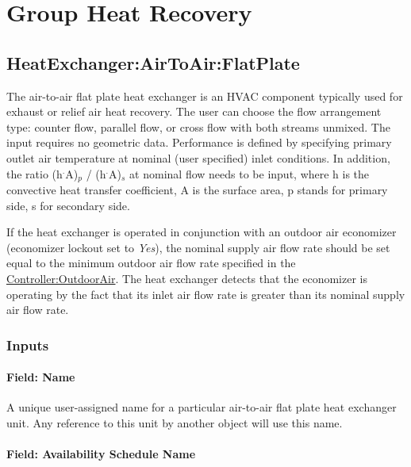 \section{Group Heat Recovery}\label{group-heat-recovery}

\subsection{HeatExchanger:AirToAir:FlatPlate}\label{heatexchangerairtoairflatplate}

The air-to-air flat plate heat exchanger is an HVAC component typically used for exhaust or relief air heat recovery. The user can choose the flow arrangement type: counter flow, parallel flow, or cross flow with both streams unmixed. The input requires no geometric data. Performance is defined by specifying primary outlet air temperature at nominal (user specified) inlet conditions. In addition, the ratio (h\(^{.}\)A)\(_{p}\) / (h\(^{.}\)A)\(_{s}\) at nominal flow needs to be input, where h is the convective heat transfer coefficient, A is the surface area, p stands for primary side, s for secondary side.

If the heat exchanger is operated in conjunction with an outdoor air economizer (economizer lockout set to \emph{Yes}), the nominal supply air flow rate should be set equal to the minimum outdoor air flow rate specified in the \hyperref[controlleroutdoorair]{Controller:OutdoorAir}. The heat exchanger detects that the economizer is operating by the fact that its inlet air flow rate is greater than its nominal supply air flow rate.

\subsubsection{Inputs}\label{inputs-021}

\paragraph{Field: Name}\label{field-name-020}

A unique user-assigned name for a particular air-to-air flat plate heat exchanger unit. Any reference to this unit by another object will use this name.

\paragraph{Field: Availability Schedule Name}\label{field-availability-schedule-name-008}

